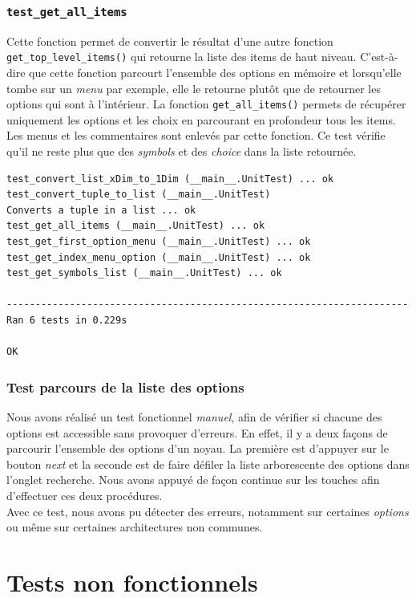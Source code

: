 ﻿\documentclass[17pts]{report}
\begin{document}
\subsubsection{\texttt{test\_get\_all\_items}}
\label{ssub:TestGetAllItems}
Cette fonction permet de convertir le résultat d'une autre fonction
\verb|get_top_level_items()| qui retourne la liste des items de haut niveau.
C'est-à-dire que cette fonction parcourt l'ensemble des options en mémoire et
lorsqu'elle tombe sur un \textit{menu} par exemple, elle le retourne plutôt que
de retourner les options qui sont à l'intérieur. La fonction
\verb|get_all_items()| permets de récupérer uniquement les options et les choix
en parcourant en profondeur tous les items. Les menus et les commentaires sont
enlevés par cette fonction. Ce test vérifie qu'il ne reste plus que des
\textit{symbols} et des \textit{choice} dans la liste retournée.

\begin{verbatim}
test_convert_list_xDim_to_1Dim (__main__.UnitTest) ... ok
test_convert_tuple_to_list (__main__.UnitTest)
Converts a tuple in a list ... ok
test_get_all_items (__main__.UnitTest) ... ok
test_get_first_option_menu (__main__.UnitTest) ... ok
test_get_index_menu_option (__main__.UnitTest) ... ok
test_get_symbols_list (__main__.UnitTest) ... ok

----------------------------------------------------------------------
Ran 6 tests in 0.229s

OK
\end{verbatim}


\subsubsection{Test parcours de la liste des options}
\label{ssub:Test parcours de la liste des options}

Nous avons réalisé un test fonctionnel \textit{manuel}, afin de vérifier si
chacune des options est accessible sans provoquer d'erreurs. En effet, il y
a deux façons de parcourir l'ensemble des options d'un noyau.
La première est d'appuyer sur le bouton \textit{next} et la seconde est de
faire défiler la liste arborescente des options dans l'onglet recherche.
Nous avons appuyé de façon continue sur les touches afin d'effectuer ces deux
procédures.\\
Avec ce test, nous avons pu détecter des erreurs, notamment sur certaines
\textit{options} ou même sur certaines architectures non communes.

\section{Tests non fonctionnels}
\label{sec:Tests non fonctionnels}
\end{document}
